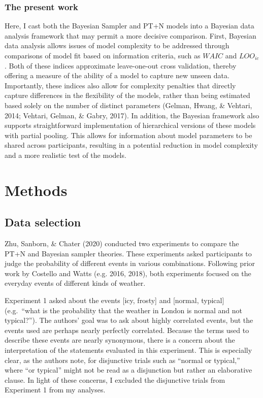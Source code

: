 \documentclass[
  english,
  man,floatsintext]{apa6}
\begin{document}
\hypertarget{the-present-work}{%
\subsubsection{The present work}\label{the-present-work}}

Here, I cast both the Bayesian Sampler and PT+N models into a Bayesian data analysis framework that may permit a more decisive comparison. First, Bayesian data analysis allows issues of model complexity to be addressed through comparisons of model fit based on information criteria, such as \(WAIC\) and \(LOO_{ic}\). Both of these indices approximate leave-one-out cross validation, thereby offering a measure of the ability of a model to capture new unseen data. Importantly, these indices also allow for complexity penalties that directly capture differences in the flexibility of the models, rather than being estimated based solely on the number of distinct parameters (Gelman, Hwang, \& Vehtari, 2014; Vehtari, Gelman, \& Gabry, 2017). In addition, the Bayesian framework also supports straightforward implementation of hierarchical versions of these models with partial pooling. This allows for information about model parameters to be shared across participants, resulting in a potential reduction in model complexity and a more realistic test of the models.

\hypertarget{methods}{%
\section{Methods}\label{methods}}

\hypertarget{data-selection}{%
\subsection{Data selection}\label{data-selection}}

Zhu, Sanborn, \& Chater (2020) conducted two experiments to compare the PT+N and Bayesian sampler theories. These experiments asked participants to judge the probability of different events in various combinations. Following prior work by Costello and Watts (e.g. 2016, 2018), both experiments focused on the everyday events of different kinds of weather.

Experiment 1 asked about the events {[}icy, frosty{]} and {[}normal, typical{]} (e.g.~``what is the probability that the weather in London is normal and not typical?''). The authors' goal was to ask about highly correlated events, but the events used are perhaps nearly perfectly correlated. Because the terms used to describe these events are nearly synonymous, there is a concern about the interpretation of the statements evaluated in this experiment. This is especially clear, as the authors note, for disjunctive trials such as ``normal or typical,'' where ``or typical'' might not be read as a disjunction but rather an elaborative clause. In light of these concerns, I excluded the disjunctive trials from Experiment 1 from my analyses.
\end{document}
